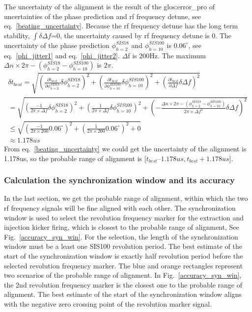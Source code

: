The uncertainty of the alignment is the result of the \gls{glos:error_pro} of uncertainties of the phase prediction and rf frequency detune, see eq.~\ref{beating_uncertainty}. Because the rf frequency detune has the long term stability, $\int\delta \Delta f$=0, the uncertainty caused by rf frequency detune is 0. The uncertainty of the phase prediction $\phi_{h=2}^{SIS18}$ and $\phi_{h=10}^{SIS100}$ is $0.06^\circ$, see eq.~\ref{phi_jitter1} and eq.~\ref{phi_jitter2}. $\Delta$f is 200Hz. The maximum ${\Delta n} \times {2\pi} - (\phi_{h=2}^{SIS18}-\phi_{h=10}^{SIS100})$ is $2\pi$.
\begin{equation}
\begin{aligned}
\delta t_{best} =\sqrt {(\frac {\partial t_{best}}{\partial \phi_{h=2}^{SIS18}}\delta \phi_{h=2}^{SIS18})^2 + (\frac {\partial t_{best}}{\partial \phi_{h=10}^{SIS100}}\delta \phi_{h=10}^{SIS100})^2+(\frac {\partial t_{best}}{\partial \Delta f}\delta \Delta f)^2} \\
 =\sqrt {(\frac{-1}{{2\pi} \times {\Delta f}}\delta \phi_{h=2}^{SIS18})^2+(\frac{1}{{2\pi} \times {\Delta f}}\delta \phi_{h=10}^{SIS100})^2+(-\frac{{\Delta n} \times {2\pi} - (\phi_{h=2}^{SIS18}-\phi_{h=10}^{SIS100})}{{2\pi} \times {\Delta f}^2}\delta \Delta f)^2} \\
\le \sqrt {(\frac{-1}{{2\pi} \times {200}}0.06^\circ)^2+(\frac{1}{{2\pi} \times {200}}0.06^\circ)^2+0}\\
\approx 1.178us \label{beating_uncertainty}
\end{aligned}
\end{equation}
From eq.~\ref{beating_uncertainty} we could get the uncertainty of the alignment is 1.178us, so the probable range of alignment is [$t_{best} – 1.178us, t_{best}+ 1.178us$].
\subsubsection{Calculation the synchronization window and its accuracy}
In the last section, we get the probable range of alignment, within which the two rf frequency signals will be fine aligned with each other. The synchronization window is used to select the revolution frequency marker for the extraction and injection kicker firing, which is closest to the probable range of alignment, See Fig.~\ref{accuracy_syn_win}. For the selection, the length of the synchronization window must be a least one SIS100 revolution period. The best estimate of the start of the synchronization window is exactly half revolution period before the selected revolution frequency marker. The blue and orange rectangles represent two scenarios of the probable range of alignment. In Fig.~\ref{accuracy_syn_win}, the 2nd revolution frequency marker is the closest one to the probable range of alignment. The best estimate of the start of the synchronization window aligns with the negative zero crossing point of the revolution marker signal.

